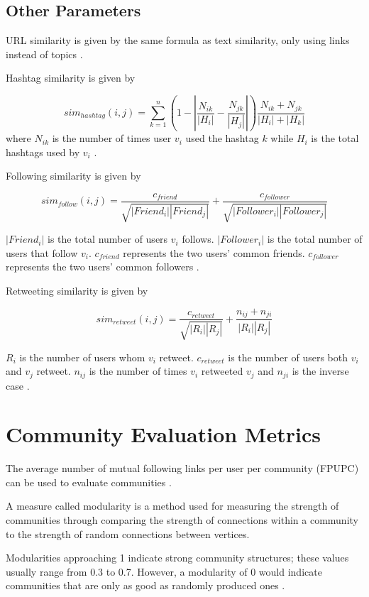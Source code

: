 \subsection{Other Parameters}


URL similarity is given by the same formula as text similarity, only using links instead of topics \cite{Zhang:2012}.


Hashtag similarity is given by 


\begin{equation}
	sim_{hashtag}(i,j) = \sum_{k=1}^n (1 - \left|{\frac{N_{ik}}{\left|{H_i}\right|} - \frac{N_{jk}}{\left|{H_j}\right|}}\right|)\frac{N_{ik} + N_{jk}}{\left|{H_i}\right| + \left|{H_k}\right|}
\end{equation}where $N_{ik}$ is the number of times user $v_i$ used the hashtag $k$ while $H_i$ is the total hashtags used by $v_i$ \cite{Zhang:2012}.


Following similarity is given by 


\begin{equation}
	sim_{follow}(i,j) = \frac{c_{friend}}{\sqrt{\left|{Friend_i}\right|\left|{Friend_j}\right|}} + \frac{c_{follower}}{\sqrt{\left|{Follower_i}\right|\left|{Follower_j}\right|}}
\end{equation}


$\left|{Friend_i}\right|$ is the total number of users $v_i$ follows. $\left|{Follower_i}\right|$ is the total number of users that follow $v_i$. $c_{friend}$ represents the two users’ common friends. $c_{follower}$ represents the two users’ common followers \cite{Zhang:2012}.


Retweeting similarity is given by 


\begin{equation}
	sim_{retweet}(i,j) = \frac{c_{retweet}}{\sqrt{\left|{R_i}\right|\left|{R_j}\right|}} + \frac{n_{ij} + n_{ji}}{\left|{R_i}\right|\left|{R_j}\right|}
\end{equation}


$R_i$ is the number of users whom $v_i$ retweet. $c_{retweet}$ is the number of users both $v_i$ and $v_j$ retweet. $n_{ij}$ is the number of times $v_i$ retweeted $v_j$ and $n_{ji}$ is the inverse case \cite{Zhang:2012}. 


\section{Community Evaluation Metrics}


The average number of mutual following links per user per community (FPUPC) can be used to evaluate communities \cite{Zhang:2012}. 


A measure called modularity is a method used for measuring the strength of communities through comparing the strength of connections within a community to the strength of random connections between vertices.\cite{Newman:2004}


Modularities approaching 1 indicate strong community structures; these values usually range from 0.3 to 0.7. However, a modularity of 0 would indicate communities that are only as good as randomly produced ones \cite{Newman:2004}. 
